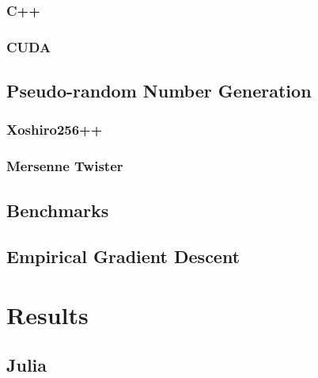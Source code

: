 \documentclass{article}
\begin{document}
            \subsubsection{C++}

            \subsubsection{CUDA}

        \subsection{Pseudo-random Number Generation}

            \subsubsection{Xoshiro256++}

            \subsubsection{Mersenne Twister}

        \subsection{Benchmarks}

        \subsection{Empirical Gradient Descent}

    \section{Results}

        \subsection{Julia}
\end{document}
